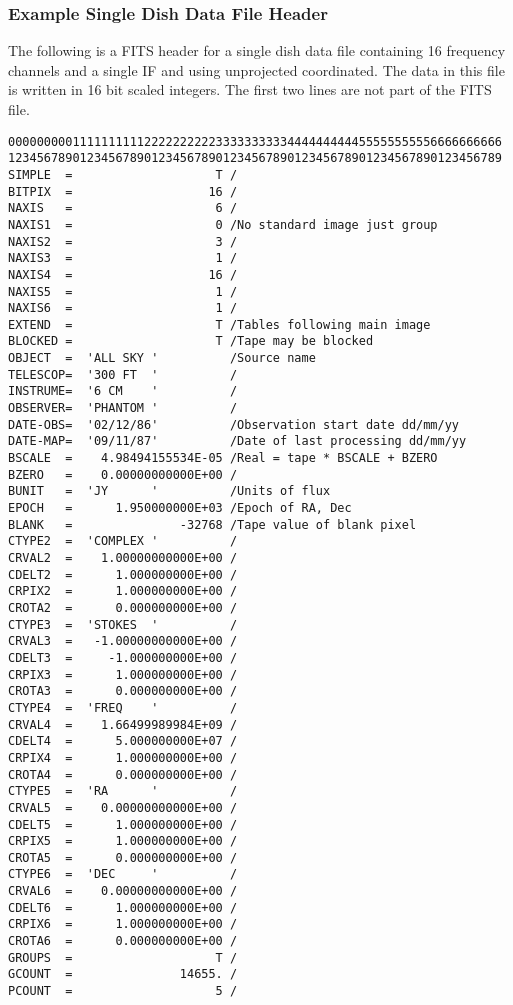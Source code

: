 \subsubsection{Example Single Dish Data File Header }
The following is a FITS header for a single dish data file
containing 16 frequency channels and a single IF and using unprojected
coordinated.  The data in this file is written in 16 bit scaled
integers.  The first two lines are not part of the FITS file.

\begin{verbatim}
000000000111111111122222222223333333333444444444455555555556666666666
123456789012345678901234567890123456789012345678901234567890123456789
SIMPLE  =                    T /
BITPIX  =                   16 /
NAXIS   =                    6 /
NAXIS1  =                    0 /No standard image just group
NAXIS2  =                    3 /
NAXIS3  =                    1 /
NAXIS4  =                   16 /
NAXIS5  =                    1 /
NAXIS6  =                    1 /
EXTEND  =                    T /Tables following main image
BLOCKED =                    T /Tape may be blocked
OBJECT  =  'ALL SKY '          /Source name
TELESCOP=  '300 FT  '          /
INSTRUME=  '6 CM    '          /
OBSERVER=  'PHANTOM '          /
DATE-OBS=  '02/12/86'          /Observation start date dd/mm/yy
DATE-MAP=  '09/11/87'          /Date of last processing dd/mm/yy
BSCALE  =    4.98494155534E-05 /Real = tape * BSCALE + BZERO
BZERO   =    0.00000000000E+00 /
BUNIT   =  'JY      '          /Units of flux
EPOCH   =      1.950000000E+03 /Epoch of RA, Dec
BLANK   =               -32768 /Tape value of blank pixel
CTYPE2  =  'COMPLEX '          /
CRVAL2  =    1.00000000000E+00 /
CDELT2  =      1.000000000E+00 /
CRPIX2  =      1.000000000E+00 /
CROTA2  =      0.000000000E+00 /
CTYPE3  =  'STOKES  '          /
CRVAL3  =   -1.00000000000E+00 /
CDELT3  =     -1.000000000E+00 /
CRPIX3  =      1.000000000E+00 /
CROTA3  =      0.000000000E+00 /
CTYPE4  =  'FREQ    '          /
CRVAL4  =    1.66499989984E+09 /
CDELT4  =      5.000000000E+07 /
CRPIX4  =      1.000000000E+00 /
CROTA4  =      0.000000000E+00 /
CTYPE5  =  'RA      '          /
CRVAL5  =    0.00000000000E+00 /
CDELT5  =      1.000000000E+00 /
CRPIX5  =      1.000000000E+00 /
CROTA5  =      0.000000000E+00 /
CTYPE6  =  'DEC     '          /
CRVAL6  =    0.00000000000E+00 /
CDELT6  =      1.000000000E+00 /
CRPIX6  =      1.000000000E+00 /
CROTA6  =      0.000000000E+00 /
GROUPS  =                    T /
GCOUNT  =               14655. /
PCOUNT  =                    5 /

\end{verbatim}
